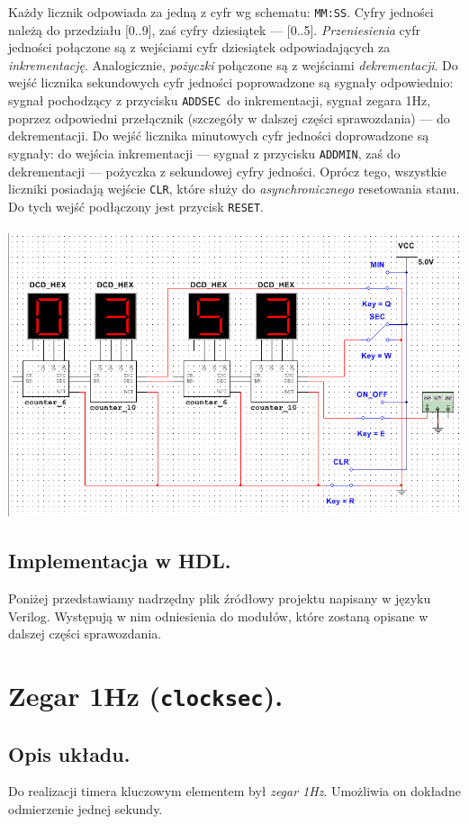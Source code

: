 \documentclass[a4paper,oneside]{report}
\newcommand{\reset}{\texttt{RESET}}
\newcommand{\addmin}{\texttt{ADD\textunderscore MIN}}
\newcommand{\addsec}{\texttt{ADD\textunderscore SEC}}
\newcommand{\clocksec}{\texttt{clock\textunderscore sec}}
\begin{document}
Każdy licznik odpowiada za jedną z cyfr wg schematu: \texttt{MM:SS}.
Cyfry jedności należą do przedziału [0..9], zaś cyfry dziesiątek ---
[0..5]. \emph{Przeniesienia} cyfr jedności połączone są z wejściami
cyfr dziesiątek odpowiadających za \emph{inkrementację}.
Analogicznie, \emph{pożyczki} połączone są z wejściami
\emph{dekrementacji}. Do wejść licznika sekundowych cyfr jedności
poprowadzone są sygnały odpowiednio: sygnał pochodzący z przycisku
\addsec\ do inkrementacji, sygnał zegara 1Hz, poprzez odpowiedni
przełącznik (szczegóły w dalszej części sprawozdania) --- do
dekrementacji. Do wejść licznika minutowych cyfr jedności
doprowadzone są sygnały: do wejścia inkrementacji --- sygnał z
przycisku \addmin , zaś do dekrementacji --- pożyczka z sekundowej
cyfry jedności. Oprócz tego, wszystkie liczniki posiadają wejście
\texttt{CLR}, które służy do \emph{asynchronicznego} resetowania
stanu. Do tych wejść podłączony jest przycisk \reset .
\\ \\
\includegraphics[width=\textwidth]{multisim/timer.png}
\subsection{Implementacja w HDL.}
Poniżej przedstawiamy nadrzędny plik źródłowy projektu napisany w
języku Verilog. Występują w nim odniesienia do modułów, które
zostaną opisane w dalszej części sprawozdania.


\section{Zegar 1Hz (\clocksec).}
\subsection{Opis układu.}
Do realizacji timera kluczowym elementem był \emph{zegar 1Hz}.
Umożliwia on dokładne odmierzenie jednej sekundy.
\end{document}
